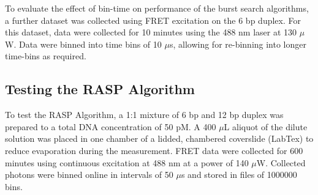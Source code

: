 \documentclass[10pt]{article}
\begin{document}
To evaluate the effect of bin-time on performance of the burst search algorithms, a further dataset was collected using FRET excitation on the 6 bp duplex. For this dataset, data were collected for 10 minutes using the 488 nm laser at 130 $\mu$W. Data were binned into time bins of 10 $\mu$s, allowing for re-binning into longer time-bins as required.


\subsection*{Testing the RASP Algorithm}
To test the RASP Algorithm, a 1:1 mixture of 6 bp and 12 bp duplex was prepared to a total DNA concentration of 50 pM. A 400 $\mu$L aliquot of the dilute solution was placed in one chamber of a lidded, chambered coverslide (LabTex) to reduce evaporation during the measurement. FRET data were collected for 600 minutes using continuous excitation at 488 nm at a power of 140 $\mu$W. Collected photons were binned online in intervals of 50 $\mu$s and stored in files of 1000000 bins. 


\end{document}

